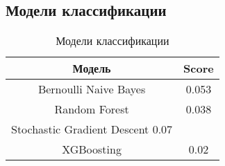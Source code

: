 \subsection{Модели классификации}

\begin{table}[H]
  \centering
  \begin{tabular} { | c | c | }
    \hline
    Модель & Score \\
    \hline
    Bernoulli Naive Bayes & 0.053 \\
    Random Forest & 0.038 \\
    Stochastic Gradient Descent 0.07 & \\
    XGBoosting & 0.02 \\
    \hline
  \end{tabular}
  \caption{Модели классификации}
\end{table}

